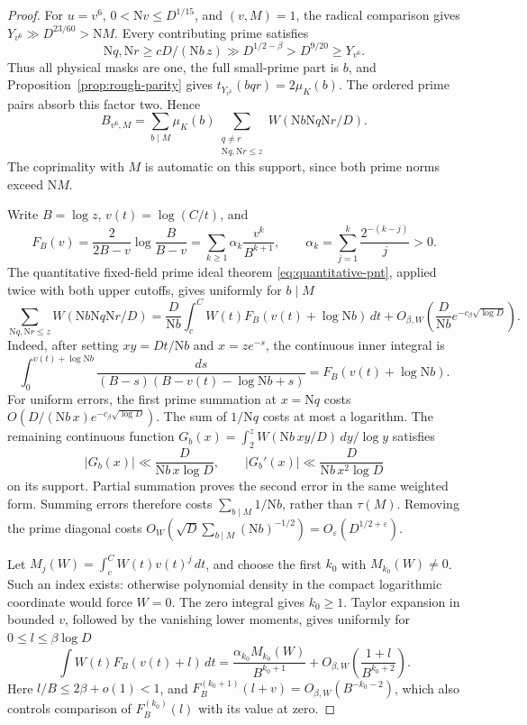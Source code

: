 \documentclass[11pt]{article}
\numberwithin{equation}{section}
\theoremstyle{definition}
\theoremstyle{remark}
\newcommand{\N}{\mathrm N}
\newcommand{\muK}{\mu_K}
\newcommand{\eps}{\varepsilon}
\begin{document}
\begin{proof}
For \(u=v^6\), \(0<\N v\le D^{1/15}\), and \((v,M)=1\),
the radical comparison gives \(Y_{v^6}\gg D^{23/60}>\N M\).
Every contributing prime satisfies
\[
 \N q,\N r\ge cD/(\N b\,z)
       \gg D^{1/2-\beta}>D^{9/20}\ge Y_{v^6}.
\]
Thus all physical masks are one, the full small-prime part is \(b\),
and Proposition~\ref{prop:rough-parity} gives \(t_{Y_{v^6}}(bqr)=2\muK(b)\).
The ordered prime pairs absorb this factor two. Hence
\begin{equation}\label{eq:complete-cofactor-coherent}
 B_{v^6,M}=\sum_{b\mid M}\muK(b)
       \sum_{\substack{q\ne r\\\N q,\N r\le z}}
                     W(\N b\N q\N r/D).
\end{equation}
The coprimality with \(M\) is automatic on this support, since both
prime norms exceed \(\N M\).

Write \(B=\log z\), \(v(t)=\log(C/t)\), and
\[
 F_B(v)=\frac{2}{2B-v}\log\frac{B}{B-v}
       =\sum_{k\ge1}\alpha_k\frac{v^k}{B^{k+1}},
 \qquad \alpha_k=\sum_{j=1}^k\frac{2^{-(k-j)}}j>0.
\]
The quantitative fixed-field prime ideal theorem
\eqref{eq:quantitative-pnt}, applied twice with both upper cutoffs,
gives uniformly for \(b\mid M\)
\begin{equation}\label{eq:complete-cofactor-continuum}
 \sum_{\N q,\N r\le z}W(\N b\N q\N r/D)
 =\frac D{\N b}\int_c^C W(t)F_B(v(t)+\log\N b)\,dt
       +O_{\beta,W}\left(\frac D{\N b}
                       e^{-c_\beta\sqrt{\log D}}\right).
\end{equation}
Indeed, after setting \(xy=Dt/\N b\) and \(x=ze^{-s}\), the
continuous inner integral is
\[
 \int_0^{v(t)+\log\N b}
 \frac{ds}{(B-s)(B-v(t)-\log\N b+s)}
       =F_B(v(t)+\log\N b).
\]
For uniform errors, the first prime summation at \(x=\N q\)
costs \(O(D/(\N b\,x)e^{-c_\beta\sqrt{\log D}})\).
The sum of \(1/\N q\) costs at most a logarithm. The remaining
continuous function
\(G_b(x)=\int_2^z W(\N b\,xy/D)\,dy/\log y\) satisfies
\[
 |G_b(x)|\ll \frac D{\N b\,x\log D},\qquad
 |G_b'(x)|\ll \frac D{\N b\,x^2\log D}
\]
on its support. Partial summation proves the second error in the
same weighted form. Summing errors therefore costs
\(\sum_{b\mid M}1/\N b\), rather than \(\tau(M)\).
Removing the prime diagonal costs
\(O_W(\sqrt D\sum_{b\mid M}(\N b)^{-1/2})=O_\eps(D^{1/2+\eps})\).

Let \(M_j(W)=\int_c^C W(t)v(t)^j\,dt\), and choose the first
\(k_0\) with \(M_{k_0}(W)\ne0\). Such an index exists:
otherwise polynomial density in the compact logarithmic coordinate
would force \(W=0\). The zero integral gives \(k_0\ge1\).
Taylor expansion in bounded \(v\), followed by the vanishing lower
moments, gives uniformly for \(0\le l\le\beta\log D\)
\[
 \int W(t)F_B(v(t)+l)\,dt
 =\frac{\alpha_{k_0}M_{k_0}(W)}{B^{k_0+1}}
       +O_{\beta,W}\left(\frac{1+l}{B^{k_0+2}}\right).
\]
Here \(l/B\le2\beta+o(1)<1\), and
\(F_B^{(k_0+1)}(l+v)=O_{\beta,W}(B^{-k_0-2})\), which also
controls comparison of \(F_B^{(k_0)}(l)\) with its value at zero.


\end{proof}
\end{document}
